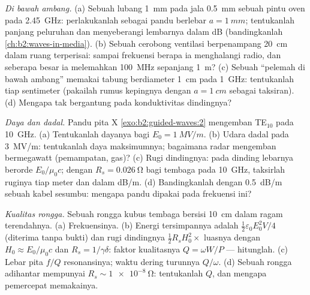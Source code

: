 \begin{exercise}[$\star\star$]\label{exo:b2:guided-waves:6}
\emph{Di bawah ambang.} (a) Sebuah lubang \qty{1}{mm} pada jala \qty{0.5}{mm} sebuah
pintu oven pada \qty{2.45}{GHz}: perlakukanlah sebagai pandu berlebar $a = \qty{1}{mm}$;
tentukanlah panjang peluruhan dan  menyeberangi lembarnya dalam dB (bandingkanlah
\cref{ch:b2:waves-in-media}). (b) Sebuah cerobong ventilasi berpenampang \qty{20}{cm}
dalam ruang terperisai: sampai frekuensi berapa ia menghalangi radio,
dan seberapa besar ia melemahkan \qty{100}{MHz} sepanjang \qty{1}{m}? (c) Sebuah
``pelemah  di bawah ambang'' memakai tabung berdiameter \qty{1}{cm} pada
\qty{1}{GHz}: tentukanlah  tiap sentimeter (pakailah rumus kepingnya dengan $a =
\qty{1}{cm}$ sebagai taksiran). (d) Mengapa  tak bergantung pada
konduktivitas dindingnya?
\end{exercise}

\begin{exercise}[$\star\star$]\label{exo:b2:guided-waves:7}
\emph{Daya dan dadal.} Pandu pita X \cref{exo:b2:guided-waves:2}
mengemban TE$_{10}$ pada \qty{10}{GHz}. (a) Tentukanlah dayanya bagi $E_0 = \qty{1}{MV/m}$. (b) Udara
dadal pada \qty{3}{MV/m}: tentukanlah daya maksimumnya; bagaimana radar mengemban
bermegawatt (pemampatan, gas)? (c) Rugi dindingnya: 
pada dinding lebarnya berorde $E_0/\mu_0c$; dengan $R_s = \qty{0.026}{\ohm}$ bagi
tembaga pada \qty{10}{GHz}, taksirlah ruginya tiap meter dan 
dalam dB/m. (d) Bandingkanlah dengan \qty{0.5}{dB/m} sebuah kabel sesumbu: mengapa
pandu dipakai pada frekuensi ini?
\end{exercise}

\begin{exercise}[$\star\star$]\label{exo:b2:guided-waves:8}
\emph{Kualitas rongga.} Sebuah rongga kubus tembaga bersisi \qty{10}{cm} dalam ragam
terendahnya. (a) Frekuensinya. (b) Energi tersimpannya adalah $\tfrac12\varepsilon_0E_0^2V/4$
(diterima tanpa bukti) dan rugi dindingnya $\tfrac12R_sH_0^2\times$ luasnya dengan $H_0 \approx E_0/
\mu_0c$ dan $R_s = 1/\gamma\delta$: faktor kualitasnya $Q = \omega W/P$ --- hitunglah.
(c) Lebar pita $f/Q$ resonansinya; waktu dering turunnya $Q/\omega$. (d) Sebuah
rongga adihantar mempunyai $R_s \sim \qty{1e-8}{\ohm}$: tentukanlah $Q$, dan mengapa
pemercepat memakainya.
\end{exercise}

